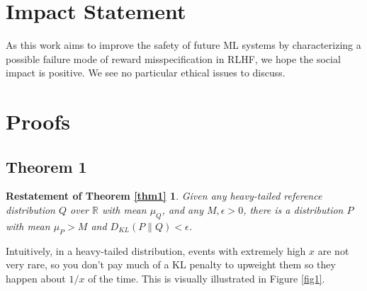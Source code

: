 \documentclass{article}
\begin{document}
\section*{Impact Statement}

As this work aims to improve the safety of future ML systems by characterizing a possible failure mode of reward misspecification in RLHF, we hope the social impact is positive. We see no particular ethical issues to discuss.

\small{
}



\appendix

\hypertarget{appendix}{%
\section{Proofs}\label{appendix}}

\subsection{Theorem 1}
\newtheorem*{theorem1}{Restatement of Theorem \ref{thm1}}
\begin{theorem1} Given any heavy-tailed reference distribution
\(Q\) over \(\mathbb R\) with mean \(\mu_Q\), and any
\(M, \epsilon > 0\), there is a distribution \(P\) with mean \(\mu_P>M\)
and \(D_{KL}(P \| Q) < \epsilon\).
\end{theorem1}

Intuitively, in a heavy-tailed distribution, events with extremely high $x$ are not very rare, so you don’t pay much of a KL penalty to upweight them so they happen about $1/x$ of the time. This is visually illustrated in Figure \ref{fig1}.
\end{document}
